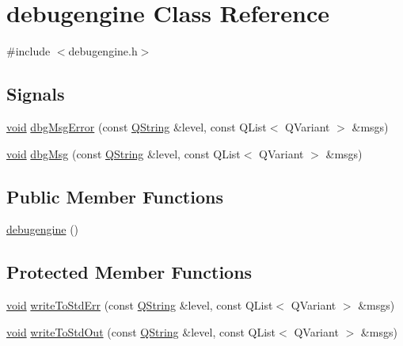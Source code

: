 \hypertarget{classdebugengine}{\section{debugengine \-Class \-Reference}
\label{classdebugengine}
}


{\ttfamily \#include $<$debugengine.\-h$>$}

\subsection*{\-Signals}
\begin{DoxyCompactItemize}
\item 
\hyperlink{group___u_a_v_objects_plugin_ga444cf2ff3f0ecbe028adce838d373f5c}{void} \hyperlink{classdebugengine_a9f8252a6598f543f2f82476803dadeab}{dbg\-Msg\-Error} (const \hyperlink{group___u_a_v_objects_plugin_gab9d252f49c333c94a72f97ce3105a32d}{\-Q\-String} \&level, const \-Q\-List$<$ \-Q\-Variant $>$ \&msgs)
\item 
\hyperlink{group___u_a_v_objects_plugin_ga444cf2ff3f0ecbe028adce838d373f5c}{void} \hyperlink{classdebugengine_a0c11284286814474411d4bd14b0f13bb}{dbg\-Msg} (const \hyperlink{group___u_a_v_objects_plugin_gab9d252f49c333c94a72f97ce3105a32d}{\-Q\-String} \&level, const \-Q\-List$<$ \-Q\-Variant $>$ \&msgs)
\end{DoxyCompactItemize}
\subsection*{\-Public \-Member \-Functions}
\begin{DoxyCompactItemize}
\item 
\hyperlink{classdebugengine_acbcb56cfc3877baebe569254b3441daa}{debugengine} ()
\end{DoxyCompactItemize}
\subsection*{\-Protected \-Member \-Functions}
\begin{DoxyCompactItemize}
\item 
\hyperlink{group___u_a_v_objects_plugin_ga444cf2ff3f0ecbe028adce838d373f5c}{void} \hyperlink{classdebugengine_a0443a03ea1f5220205b91ffe4095f486}{write\-To\-Std\-Err} (const \hyperlink{group___u_a_v_objects_plugin_gab9d252f49c333c94a72f97ce3105a32d}{\-Q\-String} \&level, const \-Q\-List$<$ \-Q\-Variant $>$ \&msgs)
\item 
\hyperlink{group___u_a_v_objects_plugin_ga444cf2ff3f0ecbe028adce838d373f5c}{void} \hyperlink{classdebugengine_a9a1392c7f7de3f73d7b2068693cd165d}{write\-To\-Std\-Out} (const \hyperlink{group___u_a_v_objects_plugin_gab9d252f49c333c94a72f97ce3105a32d}{\-Q\-String} \&level, const \-Q\-List$<$ \-Q\-Variant $>$ \&msgs)
\end{DoxyCompactItemize}



